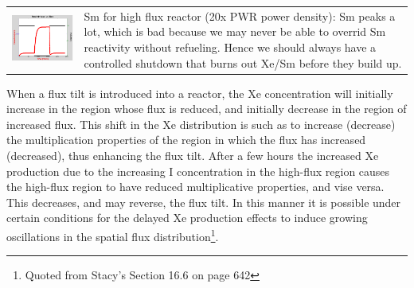 \documentclass{school-22.211-notes}
\begin{document}
\begin{table}
\begin{tabular}{|p{}|p{}|}
\begin{minipage}[b]{0.4\textwidth}
    \end{minipage}  \\ \hline
%
    \begin{minipage}[b]{0.6\textwidth}
      \includegraphics[width=3.5in]{images/dfs/Pm-Sm-3.png}
    \end{minipage}
    &  
    \begin{minipage}[b]{0.4\textwidth}    
      Sm for high flux reactor (20x PWR power density): Sm peaks a lot, which is bad because we may never be able to overrid Sm reactivity without refueling. Hence we should always have a controlled shutdown that burns out Xe/Sm before they build up. 
    \end{minipage} \\ \hline
  \end{tabular}
\end{table}

\clearpage
{}
When a flux tilt is introduced into a reactor, the Xe concentration will initially increase in the region whose flux is reduced, and initially decrease in the region of increased flux. This shift in the Xe distribution is such as to increase (decrease) the multiplication properties of the region in which the flux has increased (decreased), thus enhancing the flux tilt. After a few hours the increased Xe production due to the increasing I concentration in the high-flux region causes the high-flux region to have reduced multiplicative properties, and vise versa. This decreases, and may reverse, the flux tilt. In this manner it is possible under certain conditions for the delayed Xe production effects to induce growing oscillations in the spatial flux distribution\footnote{Quoted from Stacy's Section 16.6 on page 642}. 
\end{document}
